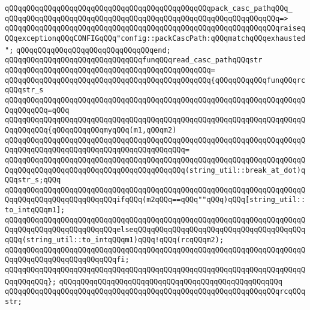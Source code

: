 \verb|qQQqqQQqqQQqqQQqqQQqqQQqqQQqqQQqqQQqqQQqqQQqqQQqpack_casc_pathqQQq_|\newline
\verb|qQQqqQQqqQQqqQQqqQQqqQQqqQQqqQQqqQQqqQQqqQQqqQQqqQQqqQQqqQQqqQQq=>|\newline
\verb|qQQqqQQqqQQqqQQqqQQqqQQqqQQqqQQqqQQqqQQqqQQqqQQqqQQqqQQqqQQqqQQqraiseqQQqexceptionqQQqCONFIGqQQq"config::packCascPath:qQQqmatchqQQqexhausted";|\newline
\verb|qQQqqQQqqQQqqQQqqQQqqQQqqQQqqQQqend;|\newline
\newline
\verb|qQQqqQQqqQQqqQQqqQQqqQQqqQQqqQQqfunqQQqread_casc_pathqQQqstr|\newline
\verb|qQQqqQQqqQQqqQQqqQQqqQQqqQQqqQQqqQQqqQQqqQQqqQQq=|\newline
\verb|qQQqqQQqqQQqqQQqqQQqqQQqqQQqqQQqqQQqqQQqqQQqqQQq{qQQqqQQqqQQqfunqQQqrcqQQqstr_s|\newline
\verb|qQQqqQQqqQQqqQQqqQQqqQQqqQQqqQQqqQQqqQQqqQQqqQQqqQQqqQQqqQQqqQQqqQQqqQQqqQQqqQQq=qQQq|\newline
\verb|qQQqqQQqqQQqqQQqqQQqqQQqqQQqqQQqqQQqqQQqqQQqqQQqqQQqqQQqqQQqqQQqqQQqqQQqqQQqqQQq{qQQqqQQqqQQqmyqQQq(m1,qQQqm2)|\newline
\verb|qQQqqQQqqQQqqQQqqQQqqQQqqQQqqQQqqQQqqQQqqQQqqQQqqQQqqQQqqQQqqQQqqQQqqQQqqQQqqQQqqQQqqQQqqQQqqQQqqQQqqQQqqQQqqQQq=|\newline
\verb|qQQqqQQqqQQqqQQqqQQqqQQqqQQqqQQqqQQqqQQqqQQqqQQqqQQqqQQqqQQqqQQqqQQqqQQqqQQqqQQqqQQqqQQqqQQqqQQqqQQqqQQqqQQqqQQq(string_util::break_at_dot)qQQqstr_s;qQQq|\newline
\newline
\verb|qQQqqQQqqQQqqQQqqQQqqQQqqQQqqQQqqQQqqQQqqQQqqQQqqQQqqQQqqQQqqQQqqQQqqQQqqQQqqQQqqQQqqQQqqQQqqQQqifqQQq(m2qQQq==qQQq""qQQq)qQQq[string_util::to_intqQQqm1];|\newline
\verb|qQQqqQQqqQQqqQQqqQQqqQQqqQQqqQQqqQQqqQQqqQQqqQQqqQQqqQQqqQQqqQQqqQQqqQQqqQQqqQQqqQQqqQQqqQQqqQQqelseqQQqqQQqqQQqqQQqqQQqqQQqqQQqqQQqqQQqqQQqqQQq(string_util::to_intqQQqm1)qQQq!qQQq(rcqQQqm2);|\newline
\verb|qQQqqQQqqQQqqQQqqQQqqQQqqQQqqQQqqQQqqQQqqQQqqQQqqQQqqQQqqQQqqQQqqQQqqQQqqQQqqQQqqQQqqQQqqQQqqQQqfi;|\newline
\verb|qQQqqQQqqQQqqQQqqQQqqQQqqQQqqQQqqQQqqQQqqQQqqQQqqQQqqQQqqQQqqQQqqQQqqQQqqQQqqQQq};|\newline
\verb|qQQqqQQqqQQqqQQqqQQqqQQqqQQqqQQqqQQqqQQqqQQqqQQqqQQq|\newline
\verb|qQQqqQQqqQQqqQQqqQQqqQQqqQQqqQQqqQQqqQQqqQQqqQQqqQQqqQQqqQQqqQQqrcqQQqstr;|\newline
